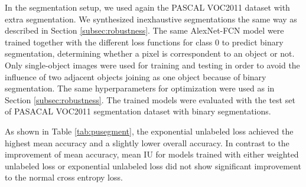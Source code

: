 \noindent
In the segmentation setup, we used again the PASCAL VOC2011 dataset with extra segmentation\cite{hariharan2011semantic}.
We synthesized inexhaustive segmentations the same way as described in Section \ref{subsec:robustness}.
The same AlexNet-FCN model were trained together with the different loss functions for class 0 to predict binary segmentation, determining whether a pixel is correspondent to an object or not.
Only single-object images were used for training and testing in order to avoid the influence of two adjacent objects joining as one object because of  binary segmentation.
The same hyperparameters for optimization were used as in Section \ref{subsec:robustness}.
The trained models were evaluated with the test set of PASACAL VOC2011 segmentation dataset with binary segmentations.

\noindent
As shown in Table \ref{tab:pusegment}, the exponential unlabeled loss achieved the highest mean accuracy and a slightly lower overall accuracy.
In contrast to the improvement of mean accuracy, mean IU for models trained with either weighted unlabeled loss or exponential unlabeled loss did not show significant improvement to the normal cross entropy loss.


\begin{table}[t]
\caption{
Best binary segmentation performance achieved on the test set of PASCAL VOC2011 segmentation dataset in the presence of inexhaustive segmentation.
Class weight 0.7:1.75 was used to balance the sample frequency difference of the two classes and negative loss were further weighted by a factor of 0.5 for weighted unlabeled loss.
Mean accuracy is equivalent to mean recall over classes.
Mean IU is the average intersection over union ratio (IU) over two classes and f.w. IU is the frequency weighted average of IU over the two classes.
Experiments were repeated twice and standard deviations were approximately 0.01.
}
\label{tab:pusegment}
\end{table}


